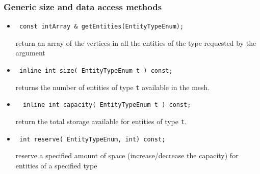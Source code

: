 \subsubsection{Generic size and data access methods}
\begin{itemize}
\item \begin{verbatim} const intArray & getEntities(EntityTypeEnum);\end{verbatim}
return an array of the vertices in all the entities of the type requested by the argument

\item \begin{verbatim} inline int size( EntityTypeEnum t ) const; \end{verbatim}
returns the number of entities of type {\tt t} available in the mesh.

\item \begin{verbatim}  inline int capacity( EntityTypeEnum t ) const; \end{verbatim}
return the total storage available for entities of type {\tt t}.

\item \begin{verbatim} int reserve( EntityTypeEnum, int) const; \end{verbatim}
reserve a specified amount of space (increase/decrease the capacity) for entities of a specified type
\end{itemize}

